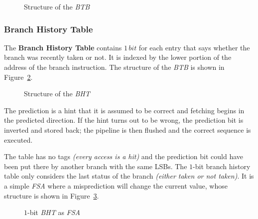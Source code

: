 \documentclass[english]{article}
\begin{document}
\begin{figure}[htbp]
  \bigskip
  \centering
  \caption{Structure of the \textit{BTB}}
  \label{fig:structure-of-BTB}
  \bigskip
\end{figure}

\subsubsection{Branch History Table}

The \textbf{Branch History Table} contains \(1 \, bit\) for each entry that says whether the branch was recently taken or not.
It is indexed by the lower portion of the address of the branch instruction.
The structure of the \textit{BTB} is shown in Figure~\ref{fig:structure-of-BHT}.

\begin{figure}[htbp]
  \bigskip
  \centering
  \caption{Structure of the \textit{BHT}}
  \label{fig:structure-of-BHT}
  \bigskip
\end{figure}

The prediction is a hint that it is assumed to be correct and fetching begins in the predicted direction.
If the hint turns out to be wrong, the prediction bit is inverted and stored back;
the pipeline is then flushed and the correct sequence is executed.

The table has no tags \textit{(every access is a hit)} and the prediction bit could have been put there by another branch with the same LSBs.
The \(1\)-bit branch history table only considers the last status of the branch \textit{(either taken or not taken)}.
It is a simple \textit{FSA} where a misprediction will change the current value, whose structure is shown in Figure~\ref{fig:BHT-as-FSA}.

\begin{figure}[htbp]
  \bigskip
  \centering


  \caption{\(1\)-bit \textit{BHT} as \textit{FSA}}
  \label{fig:BHT-as-FSA}
  \bigskip
\end{figure}
\end{document}
